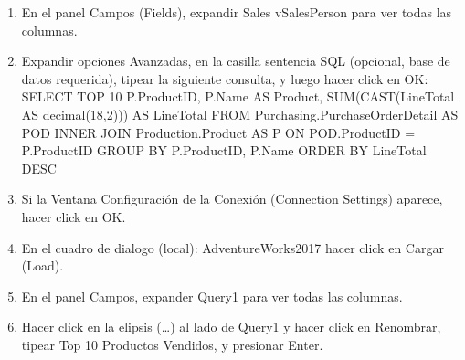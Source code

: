 \begin{enumerate}[1.]
	\item 	En el panel Campos (Fields), expandir Sales vSalesPerson para ver todas las columnas.  
	
    \item 	   Expandir opciones Avanzadas, en la casilla sentencia SQL (opcional, base de datos requerida), tipear la siguiente consulta, y luego hacer click en OK: 
    \\
    SELECT TOP 10 P.ProductID, P.Name AS Product, SUM(CAST(LineTotal AS decimal(18,2))) AS LineTotal FROM
    Purchasing.PurchaseOrderDetail AS POD INNER JOIN Production.Product AS P ON POD.ProductID = P.ProductID
    GROUP BY P.ProductID, P.Name ORDER BY LineTotal DESC 
    
	\item 	   Si la Ventana Configuración de la Conexión (Connection Settings) aparece, hacer click en OK. 
	
	\item 	  En el cuadro de dialogo (local): AdventureWorks2017 hacer click en Cargar (Load). 
	
    \item 	   En el panel Campos, expander Query1 para ver todas las columnas. 
    \item   Hacer click en la elipsis (…) al lado de Query1 y hacer click en Renombrar, tipear Top 10 Productos Vendidos, y presionar Enter.

   

\end{enumerate} 

